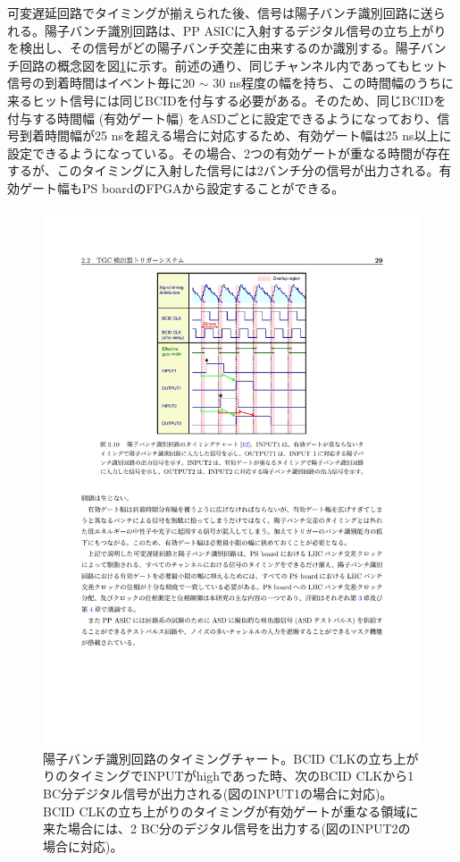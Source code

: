     可変遅延回路でタイミングが揃えられた後、信号は陽子バンチ識別回路に送られる。陽子バンチ識別回路は、PP ASICに入射するデジタル信号の立ち上がりを検出し、その信号がどの陽子バンチ交差に由来するのか識別する。陽子バンチ回路の概念図を図\ref{TGC_BCID}に示す。前述の通り、同じチャンネル内であってもヒット信号の到着時間はイベント毎に20 $\sim$ 30 ns程度の幅を持ち、この時間幅のうちに来るヒット信号には同じBCIDを付与する必要がある。そのため、同じBCIDを付与する時間幅 (有効ゲート幅) をASDごとに設定できるようになっており、信号到着時間幅が25 nsを超える場合に対応するため、有効ゲート幅は25 ns以上に設定できるようになっている。その場合、2つの有効ゲートが重なる時間が存在するが、このタイミングに入射した信号には2バンチ分の信号が出力される。有効ゲート幅もPS boardのFPGAから設定することができる。

    \begin{figure} 
    \centering
    \includegraphics[width=14cm]{fig/Intro/TGC_BCID.pdf}
    \caption[陽子バンチ識別回路のタイミングチャート]{陽子バンチ識別回路のタイミングチャート\cite{mt_takemoto}。BCID CLKの立ち上がりのタイミングでINPUTがhighであった時、次のBCID CLKから1 BC分デジタル信号が出力される(図のINPUT1の場合に対応)。BCID CLKの立ち上がりのタイミングが有効ゲートが重なる領域に来た場合には、2 BC分のデジタル信号を出力する(図のINPUT2の場合に対応)。}
    \label{TGC_BCID}
    \end{figure}

